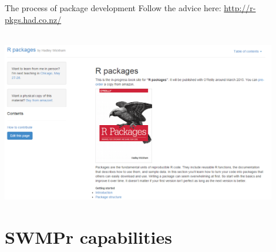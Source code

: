 \documentclass[serif]{beamer}\usepackage[]{graphicx}\usepackage[]{color}
\begin{document}
\begin{frame}{The process of package development}
Follow the advice here: \href{http://r-pkgs.had.co.nz/}{http://r-pkgs.had.co.nz/}\\~\\
\centerline{\includegraphics[width = 0.9\textwidth]{fig/hadley_book.png}}
\end{frame}

\section{SWMPr capabilities}
\end{document}
